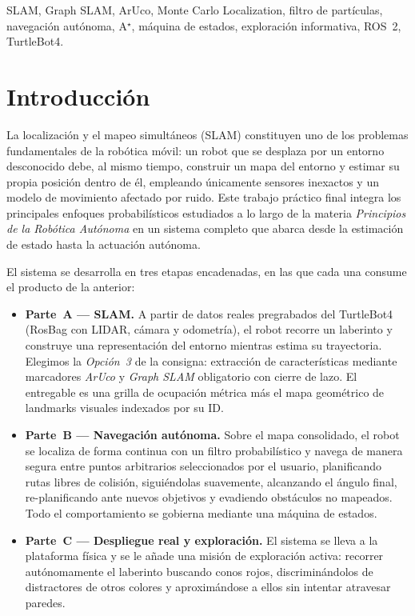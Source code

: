 \documentclass[conference]{IEEEtran}
\begin{document}
\begin{IEEEkeywords}
SLAM, Graph SLAM, ArUco, Monte Carlo Localization, filtro de partículas, navegación autónoma, A$^\star$, máquina de estados, exploración informativa, ROS~2, TurtleBot4.
\end{IEEEkeywords}

\section{Introducción}

La localización y el mapeo simultáneos (SLAM) constituyen uno de los problemas fundamentales de la robótica móvil: un robot que se desplaza por un entorno desconocido debe, al mismo tiempo, construir un mapa del entorno y estimar su propia posición dentro de él, empleando únicamente sensores inexactos y un modelo de movimiento afectado por ruido. Este trabajo práctico final integra los principales enfoques probabilísticos estudiados a lo largo de la materia \emph{Principios de la Robótica Autónoma} en un sistema completo que abarca desde la estimación de estado hasta la actuación autónoma.

El sistema se desarrolla en tres etapas encadenadas, en las que cada una consume el producto de la anterior:

\begin{itemize}
    \item \textbf{Parte~A --- SLAM.} A partir de datos reales pre\-gra\-ba\-dos del TurtleBot4 (RosBag con LIDAR, cámara y odo\-me\-tría), el robot recorre un labe\-rinto y construye una repre\-sen\-ta\-ción del entorno mientras estima su tra\-yec\-to\-ria. Elegimos la \emph{Opción~3} de la consigna: extracción de características mediante marcadores \emph{ArUco} y \emph{Graph SLAM} obligatorio con cierre de lazo. El entregable es una grilla de ocupación métrica más el mapa geométrico de landmarks visuales indexados por su ID.
    \item \textbf{Parte~B --- Navegación autónoma.} Sobre el mapa consolidado, el robot se localiza de forma continua con un filtro probabilístico y navega de manera segura entre puntos arbitrarios seleccionados por el usuario, planificando rutas libres de colisión, siguiéndolas suavemente, alcanzando el ángulo final, re-planificando ante nuevos objetivos y evadiendo obstáculos no mapeados. Todo el comportamiento se gobierna mediante una máquina de estados.
    \item \textbf{Parte~C --- Despliegue real y exploración.} El sistema se lleva a la plataforma física y se le añade una misión de exploración activa: recorrer autónomamente el laberinto buscando conos rojos, discriminándolos de distractores de otros colores y aproximándose a ellos sin intentar atravesar paredes.
\end{itemize}
\end{document}
